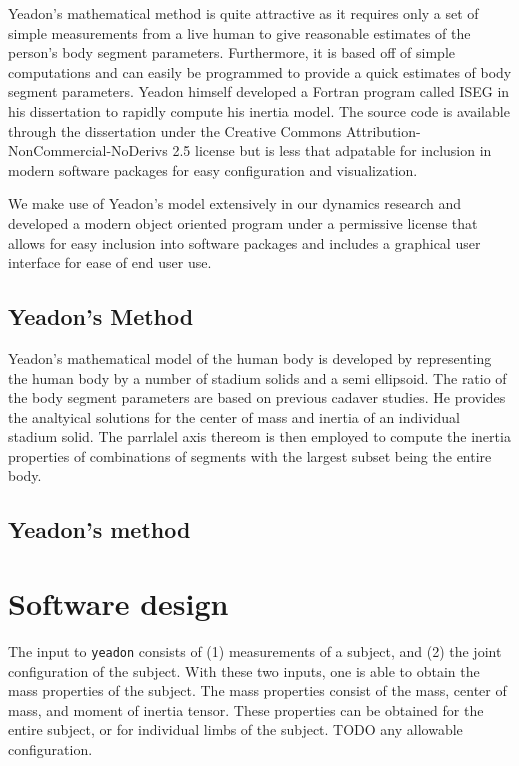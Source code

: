 \documentclass[10pt]{article}
\begin{document}
Yeadon's mathematical method is quite attractive as it requires only a set of
simple measurements from a live human to give reasonable estimates of the
person's body segment parameters. Furthermore, it is based off of simple
computations and can easily be programmed to provide a quick estimates of body
segment parameters. Yeadon himself developed a Fortran program called ISEG in
his dissertation \cite{Yeadon1984} to rapidly compute his inertia model. The
source code is available through the dissertation under the Creative Commons
Attribution-NonCommercial-NoDerivs 2.5 license but is less that adpatable for
inclusion in modern software packages for easy configuration and visualization.

We make use of Yeadon's model extensively in our dynamics research and
developed a modern object oriented program under a permissive license that
allows for easy inclusion into software packages and includes a graphical user
interface for ease of end user use.
\subsection*{Yeadon's Method}
Yeadon's mathematical model of the human body is developed by representing the
human body by a number of stadium solids and a semi ellipsoid. The ratio of the
body segment parameters are based on previous cadaver studies. He provides the
analtyical solutions for the center of mass and inertia of an individual
stadium solid. The parrlalel axis thereom is then employed to compute the
inertia properties of combinations of segments with the largest subset being
the entire body.

\subsection*{Yeadon's method}


\section*{Software design}

The input to \verb+yeadon+ consists of (1) measurements of a subject, and (2)
the joint configuration of the subject. With these two inputs, one is able to
obtain the mass properties of the subject.
The mass properties consist of the mass, center of mass, and moment of inertia
tensor. These properties can be obtained for the entire subject, or for
individual limbs of the subject. TODO any allowable configuration.
\end{document}
